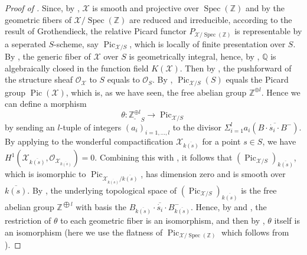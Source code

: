 \documentclass[11pt, reqno]{amsart}
\theoremstyle{plain}
\theoremstyle{definition}
\DeclareMathOperator{\Pic}{Pic}    %
\DeclareMathOperator{\Spec}{Spec}		%
\begin{document}
\begin{proof}[Proof of ]
   Since, by , $\mathcal{X}$ is smooth and projective over $\Spec(\mathbb{Z})$ and by  the geometric fibers of $\mathcal{X}/\Spec(\mathbb{Z})$ are reduced and irreducible, according to the result \cite[\S~8.2 Theorem~1]{BLR} of Grothendieck, the relative Picard functor $P_{\mathcal{X}/\Spec(\mathbb{Z})}$ is representable by a seperated $S$-scheme, say $\Pic_{\mathcal{X}/S}$, which is locally of finite presentation over $S$.
   By , the generic fiber of $\mathcal{X}$ over $S$ is geometrically integral, hence, by \cite[Proposition~5.51]{GortzWedhorn}, $\mathbb{Q}$ is algebraically closed in the function field $K(\mathcal{X})$. Then by \cite[corollaire~4.3.12]{EGA3I}, the pushforward of the structure sheaf $\mathcal{O}_{\mathcal{X}}$ to $S$ equals to $\mathcal{O}_S$. By \cite[\S~8.1, Proposition~4]{BLR}, $\Pic_{\mathcal{X}/S}(S)$ equals the Picard group $\Pic(\mathcal{X})$, which is, as we have seen, the free abelian group $\mathbb{Z}^{\oplus l}$. Hence we can define a morphism $$\theta\colon\underline{\mathbb{Z}^{\oplus l}}_S\longrightarrow\Pic_{\mathcal{X}/S}$$
   by sending an $l$-tuple of integers $(a_i)_{i=1,..., l}$ to the divisor $\Sigma_{i=1}^l a_i (\overline{B\cdot \dot{s_i} \cdot B^-})$. By applying \cite[Corollary~6.2.8]{BrionKumar} to the wonderful compactification $\mathcal{X}_{\overline{k(s)}}$ for a point $s\in S$, we have $H^1(\mathcal{X}_{\overline{k(s)}},\mathcal{O}_{\mathcal{X}_{\overline{k(s)}}})=0$. Combining this with \cite[\S~8.4 Theorem~1 (b)]{BLR}, it follows that  $(\Pic_{\mathcal{X}/S})_{\overline{k(s)}}$, which is isomorphic to $\Pic_{\mathcal{X}_{\overline{k(s)}}/\overline{k(s)}}$, has dimension zero and is smooth over $\overline{k(s)}$. By \cite[Lemma~6.1.9]{BrionKumar}, the underlying topological space of $(\Pic_{\mathcal{X}/S})_{\overline{k(s)}}$ is the free abelian group $\mathbb{Z}^{{\bigoplus}l}$ with basis the $\overline{B_{\overline{k(s)}}\cdot \dot{s_i} \cdot B_{\overline{k(s)}}^-}$. Hence, by \cite[Corollary~5.8]{GortzWedhorn} and , the restriction of $\theta$ to each geometric fiber is an isomorphism, and then by \cite[corollaire~17.9.5]{EGAIV4}, $\theta$ itself is an isomorphism (here we use the flatness of $\Pic_{\mathcal{X}/\Spec(\mathbb{Z})}$ which follows from \cite[III, Proposition~9.7]{HartshorneGTM52}).


\end{proof}
\end{document}
